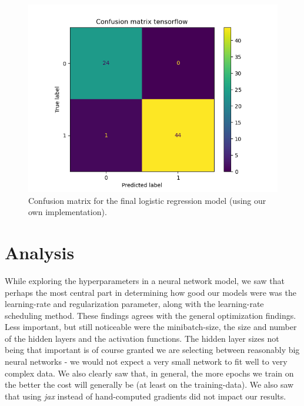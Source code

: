 \documentclass{article}
\begin{document}
\begin{figure}
      \centering
      \includegraphics[scale=0.8]{confusion_matrix_tensorflow}
      \caption{Confusion matrix for the final logistic regression model (using
            our own implementation).}
      \label{confusion-logistic-own}
\end{figure}

\section{Analysis}
While exploring the hyperparameters in a neural network model, we saw that perhaps the
most central part in determining how good our models were was the
learning-rate and regularization parameter, along with the learning-rate
scheduling method. These findings agrees with the general optimization findings.
Less important, but still noticeable were the minibatch-size, the size and number
of the hidden layers and the activation functions. The hidden layer sizes not
being that important is of course granted we are selecting between reasonably
big neural networks - we would not expect a very small network to fit well to
very complex data. We also clearly saw that, in general, the more epochs we train
on the better the cost will generally be (at least on the training-data). We
also saw that using \textit{jax} instead of hand-computed gradients did not
impact our results.
\end{document}
